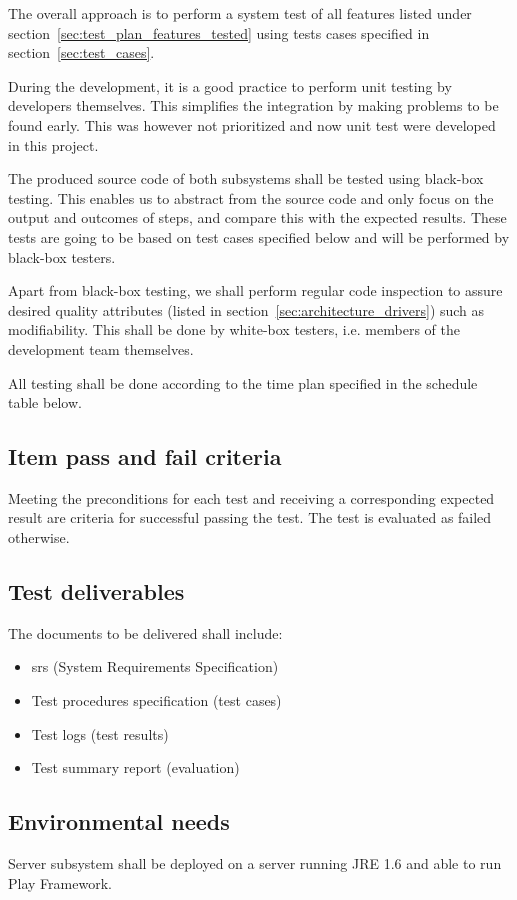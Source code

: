 \documentclass[11pt]{book}
\begin{document}
The overall approach is to perform a system test of all features listed under section~\ref{sec:test_plan_features_tested} using tests cases specified in section~\ref{sec:test_cases}.

During the development, it is a good practice to perform unit testing by developers themselves. This simplifies the integration by making problems to be found early. This was however not prioritized and now unit test were developed in this project.

The produced source code of both subsystems shall be tested using black-box testing. This enables us to abstract from the source code and only focus on the output and outcomes of steps, and compare this with the expected results. These tests are going to be based on test cases specified below and will be performed by black-box testers.

Apart from black-box testing, we shall perform regular code inspection to assure desired quality attributes (listed in section~\ref{sec:architecture_drivers}) such as modifiability. This shall be done by white-box testers, i.e. members of the development team themselves.

All testing shall be done according to the time plan specified in the schedule table below.

\subsection{Item pass and fail criteria}
Meeting the preconditions for each test and receiving a corresponding expected result are criteria for successful passing the test. The test is evaluated as failed otherwise.

\subsection{Test deliverables}
The documents to be delivered shall include:

\begin{itemize}
    \item \gls{srs} (System Requirements Specification)
    \item Test procedures specification (test cases)
    \item Test logs (test results)
    \item Test summary report (evaluation)
\end{itemize}

\subsection{Environmental needs}
Server subsystem shall be deployed on a server running JRE 1.6 and able to run Play Framework.
\end{document}
